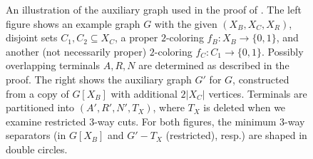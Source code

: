\begin{figure}[t]
\begin{minipage}[m]{.44\textwidth}
  \end{minipage}%
  \caption{%
  An illustration of the auxiliary graph used in the proof of .
  The left figure shows an example graph $G$ with the given
  \occ $(X_B,X_C,X_R)$, disjoint sets $C_1, C_2 \subseteq X_C$, a proper $2$-coloring
  $f_B:X_B \to \{0,1\}$, and another (not necessarily proper) $2$-coloring $f_C:C_1 \to \{0,1\}$.
  Possibly overlapping terminals $A,R,N$ are determined as described in the proof.
  The right shows the auxiliary graph $G'$ for $G$,
  constructed from a copy of $G[X_B]$ with additional $2|X_C|$ vertices.
  Terminals are partitioned into $(A',R',N',T_X)$, where
  $T_X$ is deleted when we examine restricted $3$-way cuts.
  For both figures, the minimum $3$-way separators (in $G[X_B]$ and $G'-T_X$ (restricted), resp.) are shaped in double circles.
  }
  \label{fig:find-central}
\end{figure}
